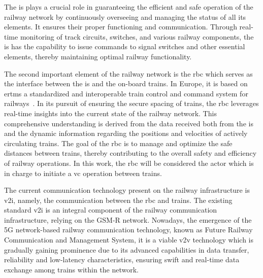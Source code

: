 \documentclass[letterpaper, 10 pt, conference]{ieeeconf}
\theoremstyle{definition}
\theoremstyle{nopoint}
\begin{document}
The \gls{is} plays a crucial role in guaranteeing the efficient and safe operation of the railway network by continuously overseeing and managing the status of all its elements. It ensures their proper functioning and communication. Through real-time monitoring of track circuits, switches, and various railway components, the \gls{is} has the capability to issue commands to signal switches and other essential elements, thereby maintaining optimal railway functionality.

The second important element of the railway network is the \gls{rbc} which serves as the interface between the \gls{is} and the on-board trains. In Europe, it is based on \gls{ertms} a standardized and interoperable train control and command system for railways~\cite{ertms}. In its pursuit of ensuring the secure spacing of trains, the \gls{rbc} leverages real-time insights into the current state of the railway network. This comprehensive understanding is derived from the data received both from the \gls{is} and the dynamic information regarding the positions and velocities of actively circulating trains. The goal of the \gls{rbc} is to manage and optimize the safe distances between trains, thereby contributing to the overall safety and efficiency of railway operations. In this work, the \gls{rbc} will be considered the actor which is in charge to initiate a \gls{vc} operation between trains.
%

\begin{comment}
	To better understand the structure and complexity of the railway network, Figure \ref{fig:railwayNetwork} illustrates the various components and their interconnections. As the latter demonstrates, the \gls{is} is the core of the entire system, with all the railway elements and the \gls{rbc} connected to it. This allows for centralized control and real-time monitoring of the entire network, ensuring the safe and efficient operation of the railway system.
\end{comment}


The current communication technology present on the railway infrastructure is \gls{v2i}, namely, the communication between the \gls{rbc} and trains. The existing standard \gls{v2i} is an integral component of the railway communication infrastructure, relying on the GSM-R network. Nowadays, the emergence of the 5G network-based railway communication technology, known as Future Railway Communication and Management System\cite{frmcs}, it is a viable \gls{v2v} technology which is gradually gaining prominence due to its advanced capabilities in data transfer, reliability and  low-latency characteristics, ensuring swift and real-time data exchange among trains within the network.
\end{document}
